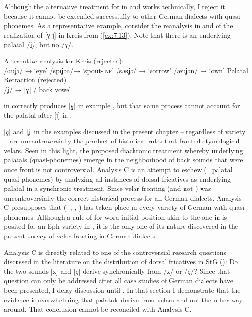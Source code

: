 Although the alternative treatment for  in  and  works technically, I reject it because it cannot be extended successfully to other German dialects with quasi-phonemes. As a representative example, consider the reanalysis in  and  of the realization of [ɣ ʝ] in Kreis  from (\ref{ex:7:13}). Note that there is an underlying palatal /ʝ/, but no /ɣ/.

\ea%
\label{ex:7:27}Alternative analysis for Kreis  (rejected):\\

\ea\label{ex:7:27a}/ɑuʝə/  \tab →  \tab [ɑuɣə]   \tab ‘eye’
\ex\label{ex:7:27b}/spɪʝən/\tab  → \tab [spɪʝən]\tab    ‘spout-\textsc{inf}’
\ex\label{ex:7:27c}/sɔʀʝə/ \tab →  \tab[sɔʀʝə]  \tab ‘sorrow’
\ex\label{ex:7:27d}/æuʝən/ \tab →  \tab[æuʝən]  \tab  ‘own’
\z 
\ex%
\label{ex:7:28}Palatal Retraction (rejected):\\
  /ʝ/ → [ɣ] / back vowel {\longrule}{\longrule}
\z 

 in  correctly produces [ɣ] in example , but that same process cannot account for the palatal after [ʝ] in .

[ç] and [ʝ] in the examples discussed in the present chapter -- regardless of variety -- are uncontroversially the product of historical rules that fronted etymological velars. Seen in this light, the proposed diachronic treatment whereby underlying palatals (quasi-phonemes) emerge in the neighborhood of back sounds that were once front is not controversial. Analysis C is an attempt to eschew  (=palatal quasi-phonemes) by analyzing all instances of dorsal fricatives as underlying palatal in a synchronic treatment. Since velar fronting (and not ) was uncontroversially the correct historical process for all German dialects, Analysis C presupposes that  (\citealt{Vennemann1972}, \citealt{McCarthy1991}, \citealt{Blevins2004}, \citealt{Hall2009a}) has taken place in every variety of German with quasi-phonemes. Although a rule of  for word-initial position akin to the one in  is posited for an Eph variety in , it is the only one of its nature discovered in the present survey of velar fronting in German dialects.

Analysis C is directly related to one of the controversial research questions discussed in the literature on the distribution of dorsal fricatives in StG (): Do the two sounds [x] and [ç] derive synchronically from /x/ or /ç/? Since that question can only be addressed after all case studies of German dialects have been presented, I delay discussion until . In that section I demonstrate that the evidence is overwhelming that palatals derive from velars and not the other way around. That conclusion cannot be reconciled with Analysis C.

